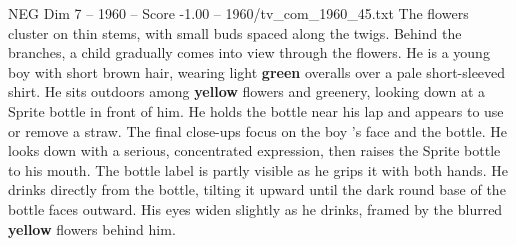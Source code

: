 \begin{textsample}{NEG Dim 7 – 1960 – Score -1.00 – 1960/tv\_com\_1960\_45.txt}
The flowers cluster on thin stems, with small buds spaced along the twigs.
Behind the branches, a child gradually comes into view through the flowers.
He is a young boy with short brown hair, wearing light \textbf{green} overalls over a pale short-sleeved shirt.
He sits outdoors among \textbf{yellow} flowers and greenery, looking down at a Sprite bottle in front of him.
He holds the bottle near his lap and appears to use or remove a straw.
The final close-ups focus on the boy ’s face and the bottle.
He looks down with a serious, concentrated expression, then raises the Sprite bottle to his mouth.
The bottle label is partly visible as he grips it with both hands.
He drinks directly from the bottle, tilting it upward until the dark round base of the bottle faces outward.
His eyes widen slightly as he drinks, framed by the blurred \textbf{yellow} flowers behind him.

\end{textsample}

